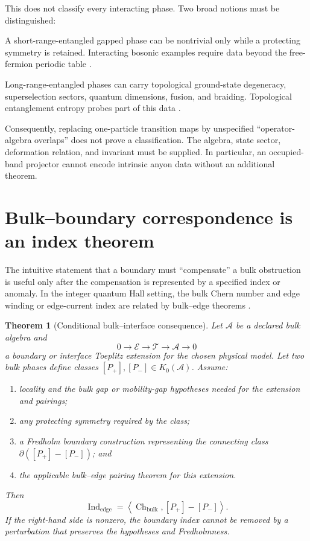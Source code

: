 \documentclass[11pt]{article}
\newtheorem{theorem}{Theorem}[section]
\theoremstyle{definition}
\theoremstyle{remark}
\newcommand{\Ind}{\operatorname{Ind}}
\begin{document}
This does not classify every interacting phase.  Two broad notions must be
distinguished:
\begin{description}[leftmargin=2.8cm,style=nextline]
\item[SPT order.] A short-range-entangled gapped phase can be nontrivial
only while a protecting symmetry is retained.  Interacting bosonic examples
require data beyond the free-fermion periodic table
\cite{ChenGuWen2013}.
\item[Intrinsic order.] Long-range-entangled phases can carry
topological ground-state degeneracy, superselection sectors, quantum
dimensions, fusion, and braiding.  Topological entanglement entropy probes
part of this data \cite{KitaevPreskill2006,LevinWen2006}.
\end{description}

Consequently, replacing one-particle transition maps by unspecified
``operator-algebra overlaps'' does not prove a classification.  The algebra,
state sector, deformation relation, and invariant must be supplied.  In
particular, an occupied-band projector cannot encode intrinsic anyon data
without an additional theorem.

\section{Bulk--boundary correspondence is an index theorem}
\label{sec:bulkboundary}

The intuitive statement that a boundary must ``compensate'' a bulk
obstruction is useful only after the compensation is represented by a
specified index or anomaly.  In the integer quantum Hall setting, the bulk
Chern number and edge winding or edge-current index are related by
bulk--edge theorems \cite{Hatsugai1993,Kellendonk2002}.

\begin{theorem}[Conditional bulk--interface consequence]
\label{thm:bulkedge}
Let \(\mathcal A\) be a declared bulk algebra and
\[
 0\longrightarrow\mathcal E
 \longrightarrow\mathcal T
 \longrightarrow\mathcal A
 \longrightarrow0
\]
a boundary or interface Toeplitz extension for the chosen physical model.
Let two bulk phases define classes
\([P_+],[P_-]\in K_0(\mathcal A)\).  Assume:
\begin{enumerate}[label=(\roman*)]
\item locality and the bulk gap or mobility-gap hypotheses needed for the
  extension and pairings;
\item any protecting symmetry required by the class;
\item a Fredholm boundary construction representing the connecting class
  \(\partial([P_+]-[P_-])\); and
\item the applicable bulk--edge pairing theorem for this extension.
\end{enumerate}
Then
\[
 \Ind_{\mathrm{edge}}
 =
 \left\langle \operatorname{Ch}_{\mathrm{bulk}},
 [P_+]-[P_-]\right\rangle .
\]
If the right-hand side is nonzero, the boundary index cannot be removed by
a perturbation that preserves the hypotheses and Fredholmness.
\end{theorem}
\end{document}
